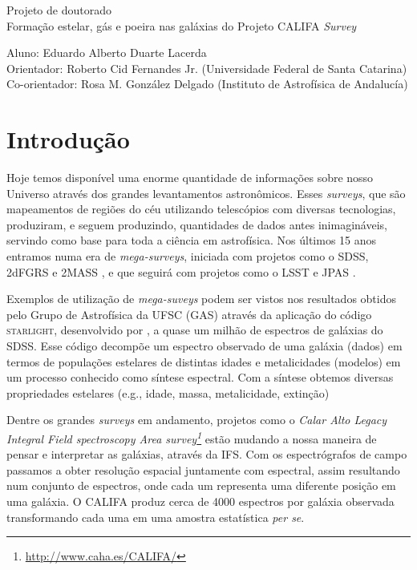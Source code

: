 \documentclass[a4paper,12pt]{article}
\def\starlight{\textsc{starlight}\xspace}      %
\def\SDSS{SDSS\xspace}           %
\begin{document}
\begin{center}
	\LARGE{Projeto de doutorado}\\ \bigskip\large{Formação estelar, gás e poeira nas galáxias do
	Projeto CALIFA {\em Survey}}
\end{center}

\vspace{1cm}

\begin{flushleft}
	Aluno: Eduardo Alberto Duarte Lacerda\\
	Orientador: Roberto Cid Fernandes Jr. (Universidade Federal de Santa Catarina)\\
	Co-orientador: Rosa M. González Delgado (Instituto de Astrofísica de Andalucía)
\end{flushleft}

\section{Introdução}
\vspace{0.3cm}

Hoje temos disponível uma enorme quantidade de informações sobre nosso Universo através dos grandes
levantamentos astronômicos. Esses {\em surveys}, que são mapeamentos de regiões do céu utilizando
telescópios com diversas tecnologias, produziram, e seguem produzindo, quantidades de dados antes
inimagináveis, servindo como base para toda a ciência em astrofísica. Nos últimos 15 anos entramos
numa era de {\em mega-surveys}, iniciada com projetos como o \SDSS \citep{York.etal.2000a}, 2dFGRS
\citep{Colless.1999a} e 2MASS \citep{Skrutskie.etal.2006a}, e que seguirá com projetos como o LSST
\citep{Ivezic.etal.2008a} e JPAS \citep{Benitez.etal.2014a}. 

Exemplos de utilização de {\em mega-suveys} podem ser vistos nos resultados obtidos pelo Grupo de
Astrofísica da UFSC (GAS) \citep[e.g., ][]{Asari.etal.2007a, ValeAsari.etal.2009a,
CidFernandes.etal.2007a, Mateus.etal.2006a} através da aplicação do código \starlight, desenvolvido
por \citet{CidFernandes.etal.2005a}, a quase um milhão de espectros de galáxias do \SDSS. Esse
código decompõe um espectro observado de uma galáxia (dados) em termos de populações estelares de
distintas idades e metalicidades (modelos) em um processo conhecido como síntese espectral. Com a
síntese obtemos diversas propriedades estelares (e.g., idade, massa, metalicidade, extinção)

Dentre os grandes {\em surveys} em andamento, projetos como o {\em Calar Alto Legacy Integral Field
spectroscopy Area survey\footnote{\url{http://www.caha.es/CALIFA/}}} \citep[CALIFA;
][]{Husemann.etal.2013a} estão mudando a nossa maneira de pensar e interpretar as galáxias, através
da IFS. Com os espectrógrafos de campo passamos a obter resolução espacial juntamente com espectral,
assim resultando num conjunto de espectros, onde cada um representa uma diferente posição em uma
galáxia. O CALIFA produz cerca de 4000 espectros por galáxia observada transformando cada uma em uma
amostra estatística {\em per se}.
\end{document}

